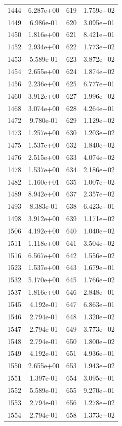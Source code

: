 \documentclass[12pt]{article}
\begin{document}
\begin{longtable}{@{}cccc@{}}
1444 & 6.287e+00 & 619 & 1.759e+02 \\
1449 & 6.986e-01 & 620 & 3.095e+01 \\
1450 & 1.816e+00 & 621 & 8.421e+01 \\
1452 & 2.934e+00 & 622 & 1.773e+02 \\
1453 & 5.589e-01 & 623 & 3.872e+02 \\
1454 & 2.655e+00 & 624 & 1.874e+02 \\
1456 & 2.236e+00 & 625 & 6.777e+01 \\
1460 & 3.912e+00 & 627 & 1.996e+02 \\
1468 & 3.074e+00 & 628 & 4.264e+01 \\
1472 & 9.780e-01 & 629 & 1.129e+02 \\
1473 & 1.257e+00 & 630 & 1.203e+02 \\
1475 & 1.537e+00 & 632 & 1.840e+02 \\
1476 & 2.515e+00 & 633 & 4.074e+02 \\
1478 & 1.537e+00 & 634 & 2.186e+02 \\
1482 & 1.160e+01 & 635 & 1.007e+02 \\
1489 & 8.942e+00 & 637 & 2.357e+02 \\
1493 & 8.383e-01 & 638 & 6.423e+01 \\
1498 & 3.912e+00 & 639 & 1.171e+02 \\
1506 & 4.192e+00 & 640 & 1.040e+02 \\
1511 & 1.118e+00 & 641 & 3.504e+02 \\
1516 & 6.567e+00 & 642 & 1.556e+02 \\
1523 & 1.537e+00 & 643 & 1.679e+01 \\
1532 & 5.170e+00 & 645 & 1.766e+02 \\
1537 & 1.816e+00 & 646 & 2.848e+01 \\
1545 & 4.192e-01 & 647 & 6.863e+01 \\
1546 & 2.794e-01 & 648 & 1.320e+02 \\
1547 & 2.794e-01 & 649 & 3.773e+02 \\
1548 & 2.794e-01 & 650 & 1.800e+02 \\
1549 & 4.192e-01 & 651 & 4.936e+01 \\
1550 & 2.655e+00 & 653 & 1.943e+02 \\
1551 & 1.397e-01 & 654 & 3.095e+01 \\
1552 & 5.589e-01 & 655 & 9.270e+01 \\
1553 & 2.794e-01 & 656 & 1.278e+02 \\
1554 & 2.794e-01 & 658 & 1.373e+02 \\

\end{longtable}
\end{document}
